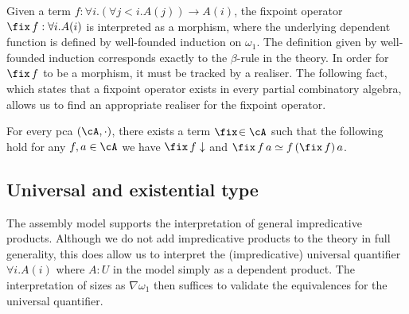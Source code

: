 Given a term \( f : \forall i. (\forall j < i. A(j)) \to A(i) \), the fixpoint operator \( \fix \, f : \forall i . A(i) \) is interpreted as a morphism, where the underlying dependent function is defined by well-founded induction on \( \omega_1 \). The definition given by well-founded induction corresponds exactly to the \( \beta \)-rule in the theory. In order for \( \fix \, f \) to be a morphism, it must be tracked by a realiser. The following fact, which states that a fixpoint operator exists in every partial combinatory algebra, allows us to find an appropriate realiser for the fixpoint operator.
\begin{proposition}
    For every pca $(\cA, \cdot)$, there exists a term $\fix\! \in \cA$ such that the following hold for any \( f, a \in \cA \) we have $\fix\,f \downarrow$ and $\fix\,f \, a \simeq f \, (\fix\,f) \, a$.
\end{proposition}


\subsection{Universal and existential type}
The assembly model supports the interpretation of general impredicative products. Although we do not add impredicative products to the theory in full generality, this does allow us to interpret the (impredicative) universal quantifier $\forall i . A(i)$ where $A : U$ in the model simply as a dependent product. The interpretation of sizes as $\nabla \omega_1$ then suffices to validate the equivalences for the universal quantifier.


